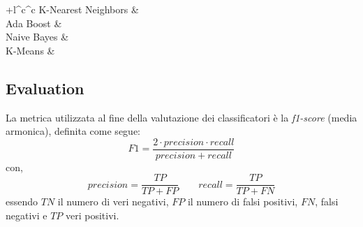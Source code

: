 \begin{center}
\begin{tabular}{+l^c^c}
						 \midrule
						 K-Nearest Neighbors &  \\
						 \midrule
						 Ada Boost &   \\
						 \midrule
						 Naive Bayes &  \\
						 \midrule
						 K-Means & \\
 
                		\toprule\rowstyle{\bfseries}
                	\end{tabular}
                	\label{tab:f1scoreML}
                \end{center}
                

        \subsection{Evaluation}
        
                La metrica utilizzata al fine della valutazione dei classificatori è la \textit{f1-score} (media armonica), definita come segue:
                \begin{displaymath}
                F1 = \frac{2 \cdot precision \cdot recall}{precision + recall}
                \end{displaymath}
                con,
                \begin{displaymath}
                precision = \frac{TP}{TP + FP} \qquad recall = \frac{TP}{TP + FN}
                \end{displaymath}
                essendo $TN$ il numero di veri negativi, $FP$ il numero di falsi positivi, $FN$, falsi negativi e $TP$ veri positivi.